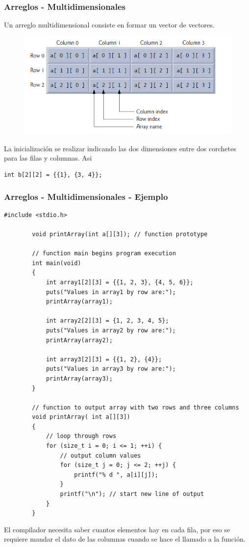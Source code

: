 \documentclass[10.5pt,scale=1.0,t,aspectratio=169,hyperref={pdfpagelabels=false}]{beamer}
\begin{document}
\begin{frame}[fragile]
	\frametitle{Arreglos - Multidimensionales}
	Un arreglo multidimensional consiste en formar un vector de vectores. 
	\begin{figure}
		\centering
		\includegraphics[scale=0.7]{Matriz}
	\end{figure}
	La inicialización se realizar indicando las dos dimensiones entre dos corchetes para las filas y columnas. Asi
	\begin{lstlisting}[style=CStyle]
	int b[2][2] = {{1}, {3, 4}};
	\end{lstlisting}
	
\end{frame}
\begin{frame}[fragile]
	\frametitle{Arreglos - Multidimensionales - Ejemplo}
	\begin{multicols}{2} 
	\begin{lstlisting}[style=CStyle]
		#include <stdio.h>
		
		void printArray(int a[][3]); // function prototype
		
		// function main begins program execution
		int main(void)
		{
			int array1[2][3] = {{1, 2, 3}, {4, 5, 6}};
			puts("Values in array1 by row are:");
			printArray(array1);
			
			int array2[2][3] = {1, 2, 3, 4, 5};
			puts("Values in array2 by row are:");
			printArray(array2);
			
			int array3[2][3] = {{1, 2}, {4}};
			puts("Values in array3 by row are:");
			printArray(array3);
		}
		
		// function to output array with two rows and three columns
		void printArray( int a[][3])
		{
			// loop through rows
			for (size_t i = 0; i <= 1; ++i) {
				// output column values
				for (size_t j = 0; j <= 2; ++j) {
					printf("% d ", a[i][j]);
				}
				printf("\n"); // start new line of output
			}
		}
	\end{lstlisting}
	\end{multicols}

El compilador necesita saber cuantos elementos hay en cada fila, por eso se requiere mandar el dato de las columnas cuando se hace el llamado a la función. 
\end{frame}
\end{document}
